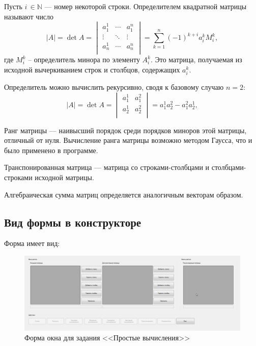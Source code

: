 Пусть $i\,\in\mathbb{N}$ --- номер некоторой строки. Определителем квадратной матрицы называют число
\begin{equation}
    \left|A\right| = \det A = \begin{vmatrix} a_1^1 & \cdots & a_1^n \\ \vdots & \ddots & \vdots \\ a_n^1 & \cdots & a_n^n \\ \end{vmatrix}
    = \sum\limits_{k=1}^n\left(-1\right)^{k+i}a_i^kM_i^k,
\end{equation}
где $M_i^k$ -- определитель минора по элементу $A_i^k$. Это матрица, получаемая из исходной вычеркиванием строк и столбцов, содержащих $a_i^k$.

Определитель можно вычислить рекурсивно, сводя к базовому случаю $n=2$:
\begin{equation}
    \left|A\right| = \det A = \begin{vmatrix} a_1^1 & a_1^2 \\ a_2^1 & a_2^2 \\ \end{vmatrix}
    = a_1^1a_2^2 - a_1^2a_2^1,
\end{equation}

Ранг матрицы --- наивысший порядок среди порядков миноров этой матрицы, отличный от нуля. Вычисление ранга матрицы возможно методом Гаусса, что и было применено в программе.

Транспонированная матрица --- матрица со строками-столбцами и столбцами-строками исходной матрицы.

Алгебраическая сумма матриц определяется аналогичным векторам образом.

\subsection{Вид формы в конструкторе}
Форма имеет вид:

\begin{figure}
\centering
\includegraphics[width=0.5\linewidth]{images/matrix-calculator/form.png}
\caption{Форма окна для задания <<Простые вычисления>>}
\label{matrix-calculator-form}
\end{figure}

